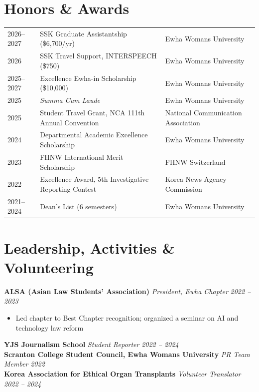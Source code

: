 \documentclass[11pt,a4paper]{article}
\newcommand{\cvactivity}[3]{\noindent\textbf{#1} \textit{#2} \hfill \textit{#3}}
\begin{document}
\section{Honors \& Awards}

\begingroup
\small
\setlength{\LTpre}{0pt}\setlength{\LTpost}{0pt}
\begin{longtable}{@{}p{1.8cm} >{\raggedright\arraybackslash}p{\dimexpr\textwidth-7.8cm-4\tabcolsep\relax} >{\raggedleft\arraybackslash}p{6cm}@{}}
2026--2027 & SSK Graduate Assistantship (\$6,700/yr) & Ewha Womans University \\
2026 & SSK Travel Support, INTERSPEECH (\$750) & Ewha Womans University \\
2025--2027 & Excellence Ewha-in Scholarship (\$10,000) & Ewha Womans University \\
2025 & \textit{Summa Cum Laude} & Ewha Womans University \\
2025 & Student Travel Grant, NCA 111th Annual Convention & National Communication Association \\
2024 & Departmental Academic Excellence Scholarship & Ewha Womans University \\
2023 & FHNW International Merit Scholarship & FHNW Switzerland \\
2022 & Excellence Award, 5th Investigative Reporting Contest & Korea News Agency Commission \\
2021--2024 & Dean's List (6 semesters) & Ewha Womans University \\
\end{longtable}
\endgroup

\section{Leadership, Activities \& Volunteering}

\cvactivity{ALSA (Asian Law Students' Association)}{President, Ewha Chapter}{2022 -- 2023}
\begin{itemize}[leftmargin=*, itemsep=2pt, topsep=4pt]
    \item Led chapter to Best Chapter recognition; organized a seminar on AI and technology law reform
\end{itemize}
\vspace{6pt}
\cvactivity{YJS Journalism School}{Student Reporter}{2022 -- 2024}\\[3pt]
\cvactivity{Scranton College Student Council, Ewha Womans University}{PR Team Member}{2022}\\[3pt]
\cvactivity{Korea Association for Ethical Organ Transplants}{Volunteer Translator}{2022 -- 2024}
\end{document}
